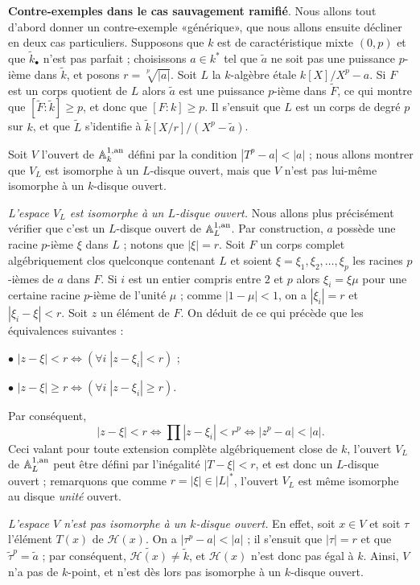 \documentclass[10pt,leqno]{article}
\renewcommand{\geq}{\geqslant}
\renewcommand{\Bbb}{\mathbb}
\renewcommand{\cal}{\mathscr}
\newcommand{\Aff}{{\Bbb A}}
\newcommand{\red}{\widetilde}
\newcommand{\gred}[1]{\widetilde{#1}_{\bullet}}
\newcommand{\hres}{{\cal H}}
\newcommand{\deux}[1]{\refstepcounter{subsection}\label{#1}\medskip\noindent {\bf (\thesubsection)}\hspace{.1cm}}
\begin{document}
\medskip
\deux{contrex} {\bf Contre-exemples dans le cas sauvagement ramifié}. Nous allons tout d'abord donner un contre-exemple «générique», que nous allons ensuite décliner en deux cas particuliers. Supposons que $k$ est de caractéristique mixte $(0,p)$ et que $\gred k$ n'est pas parfait ; choisissons $a\in k^*$ tel que $\red a$ ne soit pas une puissance $p$-ième dans $\red k$, et posons $r=\sqrt [p] {|a|}$. Soit $L$ la $k$-algèbre étale $k[X]/X^p-a$. Si $F$ est un corps quotient de $L$ alors $\red a$ est une puissance $p$-ième dans $\red F$, ce qui montre que $[\red F:\red k]\geq p$, et donc que $[F:k]\geq p$. Il s'ensuit que $L$ est un corps de degré $p$ sur $k$, et que $\red L$ s'identifie à $\red k [X/r]/(X^p-\red a)$. 

\medskip
Soit $V$ l'ouvert de $\Aff^{1,\rm an}_k$ défini par la condition $|T^p-a|<|a|$ ; nous allons montrer que $V_L$ est isomorphe à un $L$-disque ouvert, mais que $V$ n'est pas lui-même isomorphe à un $k$-disque ouvert. 

\medskip
{\em L'espace $V_L$ est isomorphe à un $L$-disque ouvert.} Nous allons plus précisément vérifier que c'est un $L$-disque ouvert de $\Aff^{1,\rm an}_L$. Par construction, $a$ possède une racine $p$-ième $\xi$ dans $L$ ; notons que $|\xi|=r$. Soit $F$ un corps complet algébriquement clos quelconque contenant $L$ et soient $\xi=\xi_1,\xi_2,\ldots,\xi_p$ les racines $p$-ièmes de $a$ dans $F$. Si $i$ est un entier compris entre $2$ et $p$ alors  $\xi_i=\xi\mu$ pour une certaine racine $p$-ième de l'unité $\mu$ ; comme $|1-\mu|<1$, on a $|\xi_i|=r$ et $|\xi_i-\xi|<r$. Soit $z$ un élément de $F$. On déduit de ce qui précède que les équivalences suivantes : 

\medskip
$\bullet$ $|z-\xi|<r\iff (\forall i\; |z-\xi_i|<r)$ ; 

\medskip 
$\bullet$ $|z-\xi|\geq r\iff (\forall i\; |z-\xi_i|\geq r)$.

\medskip
Par conséquent, $$|z-\xi|<r\iff \prod |z-\xi_i|<r^p\iff |z^p-a|<|a|.$$ Ceci valant pour toute extension complète algébriquement close de $k$, l'ouvert $V_L$ de $\Aff^{1,\rm an}_L$ peut être défini par l'inégalité $|T-\xi|<r$, et est donc un $L$-disque ouvert ; remarquons que comme $r=|\xi|\in |L|^*$, l'ouvert $V_L$ est même isomorphe au disque {\em unité} ouvert. 

\medskip
{\em L'espace $V$ n'est pas isomorphe à un $k$-disque ouvert.} En effet, soit $x\in V$ et soit $\tau$ l'élément $T(x)$ de $\hres(x)$. On a $|\tau^p-a|<|a|$ ; il s'ensuit que $|\tau|=r$ et que $\red\tau ^p=\red a$ ; par conséquent, $\red {\hres(x)}\neq \red k$, et $\hres(x)$ n'est donc pas égal à $k$. Ainsi, $V$ n'a pas de $k$-point, et n'est dès lors pas isomorphe à un $k$-disque ouvert. 
\end{document}
